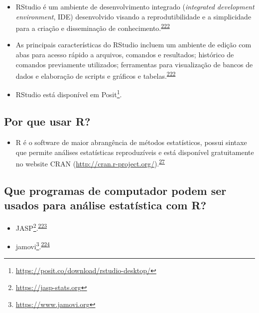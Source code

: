 \documentclass[
  a4paper,
]{book}
\providecommand{\tightlist}{%
  \setlength{\itemsep}{0pt}\setlength{\parskip}{0pt}}
\renewcommand{\href}[2]{#2\footnote{\url{#1}}}
\begin{document}
\begin{itemize}
\item
  RStudio é um ambiente de desenvolvimento integrado (\emph{integrated development environment}, IDE) desenvolvido visando a reprodutibilidade e a simplicidade para a criação e disseminação de conhecimento.\textsuperscript{\protect\hyperlink{ref-racine2011}{222}}
\item
  As principais características do RStudio incluem um ambiente de edição com abas para acesso rápido a arquivos, comandos e resultados; histórico de comandos previamente utilizados; ferramentas para visualização de bancos de dados e elaboração de scripts e gráficos e tabelas.\textsuperscript{\protect\hyperlink{ref-racine2011}{222}}
\item
  RStudio está disponível em \href{https://posit.co/download/rstudio-desktop/}{Posit}.
\end{itemize}

\hypertarget{por-que-usar-r}{%
\subsection{Por que usar R?}\label{por-que-usar-r}}

\begin{itemize}
\tightlist
\item
  R é o software de maior abrangência de métodos estatísticos, possui sintaxe que permite análises estatísticas reproduzíveis e está disponível gratuitamente no website CRAN (\url{http://cran.r-project.org/}).\textsuperscript{\protect\hyperlink{ref-mair2016}{27}}
\end{itemize}

\hypertarget{que-programas-de-computador-podem-ser-usados-para-anuxe1lise-estatuxedstica-com-r}{%
\subsection{Que programas de computador podem ser usados para análise estatística com R?}\label{que-programas-de-computador-podem-ser-usados-para-anuxe1lise-estatuxedstica-com-r}}

\begin{itemize}
\item
  \href{https://jasp-stats.org}{JASP}.\textsuperscript{\protect\hyperlink{ref-love2019}{223}}
\item
  \href{https://www.jamovi.org}{jamovi}.\textsuperscript{\protect\hyperlink{ref-sahin2020}{224}}
\end{itemize}
\end{document}
